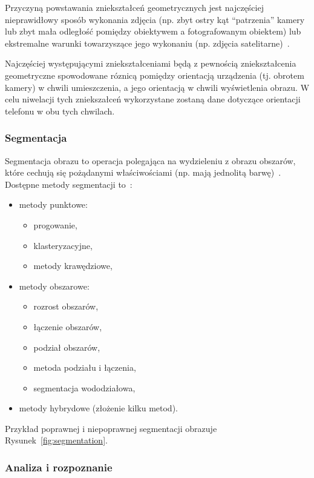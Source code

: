 Przyczyną powstawania zniekształceń geometrycznych jest najczęściej nieprawidłowy sposób wykonania zdjęcia (np. zbyt ostry kąt ``patrzenia'' kamery lub zbyt mała odległość pomiędzy obiektywem a fotografowanym obiektem) lub ekstremalne warunki towarzyszące jego wykonaniu (np. zdjęcia satelitarne)~\cite{geo:tools}.

Najczęściej występującymi zniekształceniami będą z pewnością zniekształcenia geometryczne spowodowane róznicą pomiędzy orientacją urządzenia (tj. obrotem kamery) w chwili umieszczenia, a jego orientacją w chwili wyświetlenia obrazu.
W celu niwelacji tych zniekszałceń wykorzystane zostaną dane dotyczące orientacji telefonu w obu tych chwilach.



\subsubsection{Segmentacja}
Segmentacja obrazu to operacja polegająca na wydzieleniu z obrazu obszarów, które cechują się pożądanymi właściwościami (np. mają jednolitą barwę)~\cite{anal:przet:obr}.
Dostępne metody segmentacji to~\cite{roz:obr}:
\begin{itemize}
 \item metody punktowe:
  \begin{itemize}
   \item progowanie,
   \item klasteryzacyjne,
   \item metody krawędziowe,
  \end{itemize}
 \item metody obszarowe:
  \begin{itemize}
   \item rozrost obszarów,
   \item łączenie obszarów,
   \item podział obszarów,
   \item metoda podziału i łączenia,
   \item segmentacja wododziałowa,
  \end{itemize}
 \item metody hybrydowe (złożenie kilku metod).
\end{itemize}

Przykład poprawnej i niepoprawnej segmentacji obrazuje Rysunek~\ref{fig:segmentation}.



\subsubsection{Analiza i rozpoznanie}

